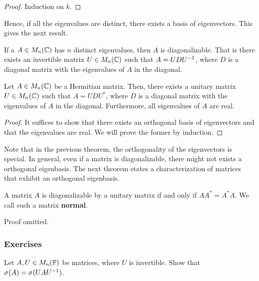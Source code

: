 \documentclass{article}
\begin{document}
\begin{proof}
Induction on $k$.
\end{proof}

Hence, if all the eigenvalues are distinct, there exists a basis of eigenvectors. This gives the next result. 

\begin{corollary}
If a $A\in M_n({\mathbb{C}})$ has $n$ distinct eigenvalues, then $A$ is diagonalizable. That is there exists an invertible matrix $U\in M_n({\mathbb{C}})$ such that $A = UDU^{-1}$, where $D$ is a diagonal matrix with the eigenvalues of $A$ in the diagonal.
\end{corollary}


\begin{theorem}
Let $A\in M_n({\mathbb{C}})$ be a Hermitian matrix. Then, there exists a unitary matrix $U\in M_n({\mathbb{C}})$ such that $A=UDU^*$, where $D$ is a diagonal matrix with the eigenvalues of $A$ in the diagonal. Furthermore, all eigenvalues of $A$ are real.
\end{theorem}

\begin{proof}
It suffices to show that there exists an orthogonal basis of eigenvectors and that the eigenvalues are real. We will prove the former by induction.
\end{proof}

Note that in the previous theorem, the orthogonality of the eigenvectors is special. In general, even if a matrix is diagonalizable, there might not exists a orthogonal eigenbasis. The next theorem states a characterization of matrices that exhibit an orthogonal eigenbasis. 

\begin{theorem}
A matrix $A$ is diagonalizable by a unitary matrix if and only if $AA^*= A^*A$. We call such a matrix \textbf{normal}.
\end{theorem}

Proof omitted.


\subsubsection{Exercises}

\begin{exercise}\label{ex: char pol indep of basis}
Let $A,U \in M_n({\mathbb{F}})$ be matrices, where $U$ is invertible. Show that $\sigma(A) =\sigma(UAU^{-1})$.
\end{exercise}
\end{document}
